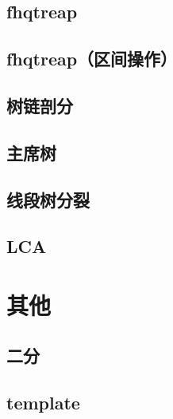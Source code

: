 \documentclass[10pt,a4paper]{article}
\begin{document}
\subsection{fhqtreap}

\subsection{fhqtreap（区间操作）}

\subsection{树链剖分}

\subsection{主席树}

\subsection{线段树分裂}

\subsection{LCA}

\section{其他}
\subsection{二分}

\subsection{template}

\end{document}
